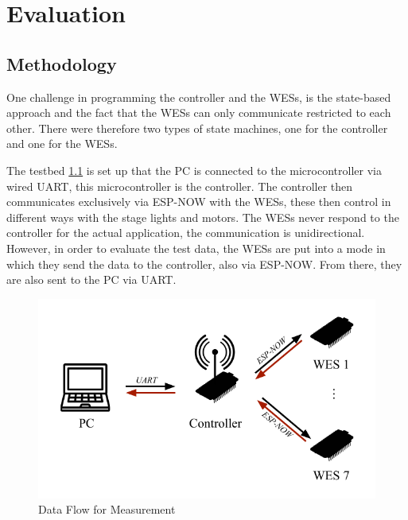 
\chapter{Evaluation}
\label{sec:evaluation}

\section{Methodology}
One challenge in programming the controller and the WESs,
is the state-based approach and the fact that the WESs can only communicate restricted to each other.
There were therefore two types of state machines, one for the controller and one for the WESs.

The testbed \cref{fig:testbed} is set up that the PC is connected to the microcontroller via wired \ac{UART}, this microcontroller is the controller.
The controller then communicates exclusively via ESP-NOW with the WESs,
these then control in different ways with the stage lights and motors.
The WESs never respond to the controller for the actual application, the communication is unidirectional.
However, in order to evaluate the test data, the WESs are put into a mode in which they send the data to the controller, also via ESP-NOW.
From there, they are also sent to the PC via UART.

\begin{figure}[h]
	\centering
	\includegraphics[scale=0.75]{figures/TestFlow.pdf}
	\caption{Data Flow for Measurement}
	\label{fig:testbed}
\end{figure}

